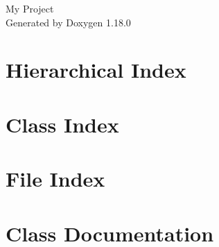 \documentclass[twoside]{book}
\newcommand{\+}{\discretionary{\mbox{\scriptsize$\hookleftarrow$}}{}{}}
\newcommand{\clearemptydoublepage}{%
    \newpage{\pagestyle{empty}\cleardoublepage}%
  }
\begin{document}
  \raggedbottom
    \hypersetup{pageanchor=false,
                bookmarksnumbered=true,
                pdfencoding=unicode
               }
  \begin{titlepage}
  \vspace*{7cm}
  \begin{center}%
  {\Large My Project}\\
  \vspace*{1cm}
  {\large Generated by Doxygen 1.18.0}\\
  \end{center}
  \end{titlepage}
  \clearemptydoublepage
  \tableofcontents
  \clearemptydoublepage
  \hypersetup{pageanchor=true}
\chapter{Hierarchical Index}

\chapter{Class Index}

\chapter{File Index}

\chapter{Class Documentation}






























\end{document}
